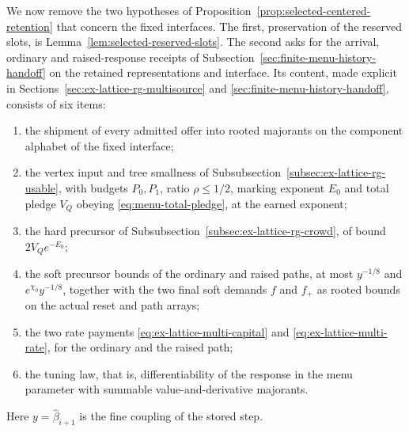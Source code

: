 We now remove the two hypotheses of
Proposition~\ref{prop:selected-centered-retention} that concern the
fixed interfaces. The first, preservation of the reserved slots, is
Lemma~\ref{lem:selected-reserved-slots}. The second asks for the
arrival, ordinary and raised-response receipts of
Subsection~\ref{sec:finite-menu-history-handoff} on the retained
representations and interface. Its content, made explicit in
Sections~\ref{sec:ex-lattice-rg-multisource} and
\ref{sec:finite-menu-history-handoff}, consists of six items:
\begin{enumerate}
\item[(A1)] the shipment of every admitted offer into rooted majorants on
 the component alphabet of the fixed interface;
\item[(A2)] the vertex input and tree smallness of
 Subsubsection~\ref{subsec:ex-lattice-rg-usable}, with budgets $P_0,P_1$,
 ratio $\rho\le1/2$, marking exponent $E_0$ and total pledge $V_Q$
 obeying \eqref{eq:menu-total-pledge}, at the earned exponent;
\item[(A3)] the hard precursor of Subsubsection~\ref{subsec:ex-lattice-rg-crowd},
 of bound $2V_Qe^{-E_0}$;
\item[(A4)] the soft precursor bounds of the ordinary and raised paths,
 at most $y^{-1/8}$ and $e^{\chi_0}y^{-1/8}$, together with the two
 final soft demands $f$ and $f_+$ as rooted bounds on the actual reset
 and path arrays;
\item[(A5)] the two rate payments \eqref{eq:ex-lattice-multi-capital} and
 \eqref{eq:ex-lattice-multi-rate}, for the ordinary and the raised path;
\item[(A6)] the tuning law, that is, differentiability of the response
 in the menu parameter with summable value-and-derivative majorants.
\end{enumerate}
Here $y=\widehat\beta_{i+1}$ is the fine coupling of the stored step.

